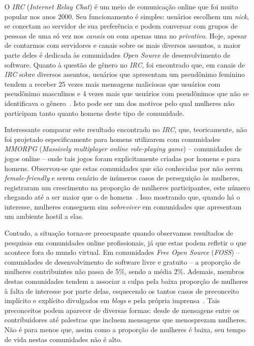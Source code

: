 O \emph{IRC} (\emph{Internet Relay Chat}) é um meio de comunicação online que foi muito popular nos anos 2000. Seu funcionamento é simples: usuários escolhem um \emph{nick}, se conectam ao servidor de sua preferência e podem conversar com grupos de pessoas de uma só vez nos \emph{canais} ou com apenas uma no \emph{privativo}. Hoje, apesar de contarmos com servidores e canais sobre os mais diversos assuntos, a maior parte deles é dedicada às comunidades \emph{Open Source} de desenvolvimento de software. Quanto à questão de gênero no \emph{IRC}, foi encontrado que, em canais de \emph{IRC} sobre diversos assuntos, usuários que apresentam um pseudônimo feminino tendem a receber 25 vezes mais mensagens maliciosas que usuários com pseudônimo masculinos e 4 vezes mais que usuários com pseudônimos que não se identificava o gênero~\cite{meyer2006assessing}. Isto pode ser um dos motivos pelo qual mulheres não participam tanto quanto homens deste tipo de comunidade. 

Interessante comparar este resultado encontrado no \emph{IRC}, que, teoricamente, não foi projetado especificamente para homens utilizarem com comunidades \emph{MMORPG} (\emph{Massively multiplayer online role-playing game}) -- comunidades de jogos online -- onde tais jogos foram explicitamente criadas por homens e para homens. Observou-se que estas comunidades que são conhecidas por não serem \textit{female-friendly} e serem cenário de inúmeros casos de perseguição às mulheres, registraram um crescimento na proporção de mulheres participantes, este número chegando até a ser maior que o de homens~\cite{taylor2003multiple}. Isso mostrando que, quando há o interesse, mulheres conseguem sim \emph{sobreviver} em comunidades que apresentam um ambiente hostil a elas.

Contudo, a situação torna-se preocupante quando observamos resultados de pesquisas em comunidades online profissionais, já que estas podem refletir o que acontece fora do mundo virtual. Em comunidades \textit{Free Open Source} (\emph{FOSS}) -- comunidades de desenvolvimento de software livre e gratuito -- a proporção de mulheres contribuintes não passa de 5\%, sendo a média 2\%. Ademais, membros destas comunidades tendem a associar a culpa pela baixa proporção de mulheres à falta de interesse por parte delas, esquecendo os tantos casos de preconceito implícito e explícito divulgados em \emph{blogs} e pela própria imprensa~\cite{rustad2011suck}. Tais preconceitos podem aparecer de diversas formas: desde de mensagens entre os contribuidores até palestras que incluem mensagens que menosprezam mulheres. Não é para menos que, assim como a proporção de mulheres é baixa, seu tempo de vida nestas comunidades não é alto.

